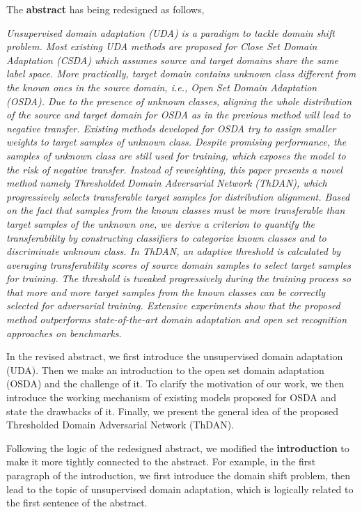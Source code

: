 The \textbf{abstract} has being redesigned as follows,
\begin{siderules}
    \textit{
        \footnotesize
        Unsupervised domain adaptation (UDA) is a paradigm to tackle domain shift problem.
        Most existing UDA methods are proposed for Close Set Domain Adaptation (\textit{CSDA}) which assumes source and target domains share the same label space.
        More practically, target domain contains unknown class different from the known ones in the source domain, i.e., Open Set Domain Adaptation (\textit{OSDA}).
        Due to the presence of unknown classes, aligning the whole distribution of the source and target domain for OSDA as in the previous method will lead to negative transfer. 
        Existing methods developed for OSDA try to assign smaller weights to target samples of unknown class.
        Despite promising performance, the samples of unknown class are still used for training, which exposes the model to the risk of negative transfer.
        Instead of reweighting, this paper presents a novel method namely Thresholded Domain Adversarial Network (\textit{ThDAN}), which progressively selects transferable target samples for distribution alignment. 
        Based on the fact that samples from the known classes must be more transferable than target samples of the unknown one, we derive a criterion to quantify the transferability by constructing classifiers to categorize known classes and to discriminate unknown class.
        In ThDAN, an adaptive threshold is calculated by averaging transferability scores of source domain samples to select target samples for training. 
        The threshold is tweaked progressively during the training process so that more and more target samples from the known classes can be correctly selected for adversarial training.
        Extensive experiments show that the proposed method outperforms state-of-the-art domain adaptation and open set recognition approaches on benchmarks.
    }
\end{siderules}
In the revised abstract, we first introduce the unsupervised domain adaptation (UDA).
Then we make an introduction to the open set domain adaptation (OSDA) and the challenge of it.
To clarify the motivation of our work, we then introduce the working mechanism of existing models proposed for OSDA and state the drawbacks of it.
Finally, we present the general idea of the proposed Thresholded Domain Adversarial Network (ThDAN).

Following the logic of the redesigned abstract, we modified the \textbf{introduction} to make it more tightly connected to the abstract.
For example, in the first paragraph of the introduction, we first introduce the domain shift problem, then lead to the topic of unsupervised domain adaptation, which is logically related to the first sentence of the abstract. 

